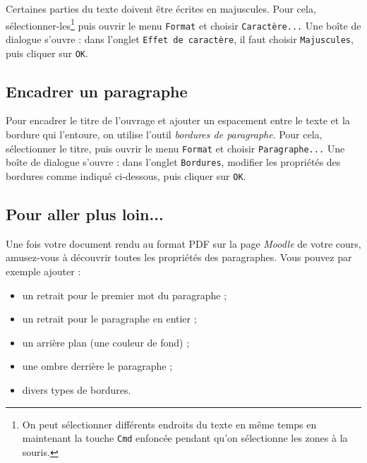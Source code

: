 Certaines parties du texte doivent être écrites en majuscules. Pour cela, sélectionner-les\footnote{On peut sélectionner différents endroits du texte en même temps en maintenant la touche \texttt{Cmd} enfoncée pendant qu'on sélectionne les zones à la souris.} puis ouvrir le menu \texttt{Format} et choisir \texttt{Caractère...} Une boîte de dialogue s'ouvre : dans l'onglet \texttt{Effet de caractère}, il faut choisir \texttt{Majuscules}, puis cliquer sur \texttt{OK}.  










\subsection{Encadrer un paragraphe} 

Pour encadrer le titre de l'ouvrage et ajouter un espacement entre le texte et la bordure qui l'entoure, on utilise l'outil \emph{bordures de paragraphe}. Pour cela, sélectionner le titre, puis ouvrir le menu \texttt{Format} et choisir \texttt{Paragraphe...} Une boîte de dialogue s'ouvre : dans l'onglet \texttt{Bordures}, modifier les propriétés des bordures comme indiqué ci-dessous, puis cliquer sur \texttt{OK}.




\subsection{Pour aller plus loin...}

Une fois votre document rendu au format PDF sur la page \emph{Moodle} de votre cours, amusez-vous à découvrir toutes les propriétés des paragraphes. Vous pouvez par exemple ajouter :
\begin{itemize}
\item un retrait pour le premier mot du paragraphe ;
\item un retrait pour le paragraphe en entier ; 
\item un arrière plan (une couleur de fond) ;
\item une ombre derrière le paragraphe ; 
\item divers types de bordures. 
\end{itemize}


